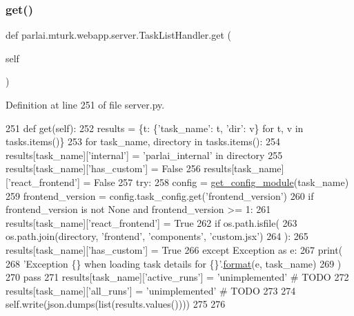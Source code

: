 \subsubsection{\texorpdfstring{get()}{get()}}
{\footnotesize\ttfamily def parlai.\+mturk.\+webapp.\+server.\+Task\+List\+Handler.\+get (\begin{DoxyParamCaption}\item[{}]{self }\end{DoxyParamCaption})}



Definition at line 251 of file server.\+py.


\begin{DoxyCode}
251     \textcolor{keyword}{def }get(self):
252         results = \{t: \{\textcolor{stringliteral}{'task\_name'}: t, \textcolor{stringliteral}{'dir'}: v\} \textcolor{keywordflow}{for} t, v \textcolor{keywordflow}{in} tasks.items()\}
253         \textcolor{keywordflow}{for} task\_name, directory \textcolor{keywordflow}{in} tasks.items():
254             results[task\_name][\textcolor{stringliteral}{'internal'}] = \textcolor{stringliteral}{'parlai\_internal'} \textcolor{keywordflow}{in} directory
255             results[task\_name][\textcolor{stringliteral}{'has\_custom'}] = \textcolor{keyword}{False}
256             results[task\_name][\textcolor{stringliteral}{'react\_frontend'}] = \textcolor{keyword}{False}
257             \textcolor{keywordflow}{try}:
258                 config = \hyperlink{namespaceparlai_1_1mturk_1_1webapp_1_1server_aee065cfdb6346d4815762ae793427f1e}{get\_config\_module}(task\_name)
259                 frontend\_version = config.task\_config.get(\textcolor{stringliteral}{'frontend\_version'})
260                 \textcolor{keywordflow}{if} frontend\_version \textcolor{keywordflow}{is} \textcolor{keywordflow}{not} \textcolor{keywordtype}{None} \textcolor{keywordflow}{and} frontend\_version >= 1:
261                     results[task\_name][\textcolor{stringliteral}{'react\_frontend'}] = \textcolor{keyword}{True}
262                 \textcolor{keywordflow}{if} os.path.isfile(
263                     os.path.join(directory, \textcolor{stringliteral}{'frontend'}, \textcolor{stringliteral}{'components'}, \textcolor{stringliteral}{'custom.jsx'})
264                 ):
265                     results[task\_name][\textcolor{stringliteral}{'has\_custom'}] = \textcolor{keyword}{True}
266             \textcolor{keywordflow}{except} Exception \textcolor{keyword}{as} e:
267                 print(
268                     \textcolor{stringliteral}{'Exception \{\} when loading task details for \{\}'}.\hyperlink{namespaceparlai_1_1chat__service_1_1services_1_1messenger_1_1shared__utils_a32e2e2022b824fbaf80c747160b52a76}{format}(e, task\_name)
269                 )
270                 \textcolor{keywordflow}{pass}
271             results[task\_name][\textcolor{stringliteral}{'active\_runs'}] = \textcolor{stringliteral}{'unimplemented'}  \textcolor{comment}{# TODO}
272             results[task\_name][\textcolor{stringliteral}{'all\_runs'}] = \textcolor{stringliteral}{'unimplemented'}  \textcolor{comment}{# TODO}
273 
274         self.write(json.dumps(list(results.values())))
275 
276 
\end{DoxyCode}
